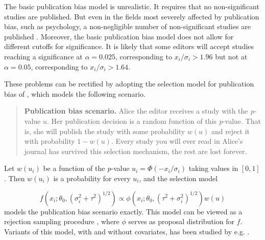 \documentclass[article]{ajs}
\numberwithin{equation}{section}
\numberwithin{figure}{section}
\theoremstyle{plain}
\theoremstyle{definition}
\theoremstyle{definition}
\theoremstyle{plain}
\renewcommand{\sqrt}[1]{{(#1)^{1/2}}}
\begin{document}
The basic publication bias model is unrealistic. It requires that no non-significant studies are published. But even in the fields most severely affected by publication bias, such as psychology, a non-negligible number of non-significant studies are published \citep{Motyl2017-dx}. Moreover, the basic publication bias model does not allow for different cutoffs for significance. It is likely that some editors will accept studies reaching a significance at $\alpha=0.025$, corresponding to $x_{i}/\sigma_{i}>1.96$ but not at $\alpha=0.05$, corresponding to $x_{i}/\sigma_{i}>1.64$.

These problems can be rectified by adopting the selection model for publication bias of \citet{iyengar1988selection}, which models the following scenario.
\begin{quote}
\textbf{Publication bias scenario.} Alice the editor receives a study with the \textit{p}-value $u$. Her publication decision is a random function of this \textit{p}-value. That is, she will publish the study with some probability $w(u)$ and reject it with probability $1-w(u)$. Every study you will ever read in Alice's journal has survived this selection mechanism, the rest are lost forever.
\end{quote}
Let $w(u_{i})$ be a function of the \textit{p}-value $u_{i}=\Phi(-x_{i}/\sigma_{i})$ taking values in $[0,1]$. Then $w(u_{i})$ is a probability for every $u_{i}$, and the selection model

\begin{equation}
f(x_{i};\theta_{0},\sqrt{\sigma_{i}^{2}+\tau^{2}})\propto\phi(x_{i};\theta_{0},\sqrt{\tau^{2}+\sigma_{i}^{2}})w(u)\label{eq:iyengar-greenhouse model}
\end{equation}
models the publication bias scenario exactly. This model can be viewed as a rejection sampling procedure \citep{flury1990acceptance,von1951various}, where $\phi$ serves as proposal distribution for $f$. Variants of this model, with and without covariates, has been studied by e.g. \citet{Dear1992-gw,Vevea1995-on,Vevea2005-xp,citkowicz2017parsimonious}.
\end{document}
